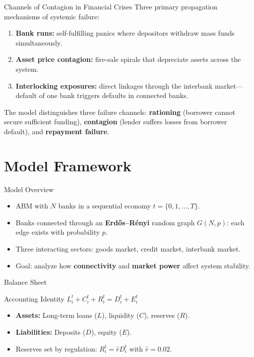 \begin{frame}{Channels of Contagion in Financial Crises}
  Three primary propagation mechanisms of systemic failure:
  \begin{enumerate}
    \item \textbf{Bank runs:} self-fulfilling panics where depositors withdraw mass funds simultaneously.
    \item \textbf{Asset price contagion:} fire-sale spirals that depreciate assets across the system.
    \item \textbf{Interlocking exposures:} direct linkages through the interbank market---default of one bank triggers defaults in connected banks.
  \end{enumerate}
  \vspace{0.3cm}
  The model distinguishes three failure channels: \textbf{rationing} (borrower cannot secure sufficient funding), \textbf{contagion} (lender suffers losses from borrower default), and \textbf{repayment failure}.
\end{frame}



\section{Model Framework}\label{sec:3}

\begin{frame}{Model Overview}
  \begin{itemize}
    \item ABM with $N$ banks in a sequential economy $t = \{0, 1, \dots, T\}$.
    \item Banks connected through an \textbf{Erd\H{o}s--R\'enyi} random graph $G(N, p)$: each edge exists with probability $p$.
    \item Three interacting sectors: goods market, credit market, interbank market.
    \item Goal: analyze how \textbf{connectivity} and \textbf{market power} affect system stability.
  \end{itemize}
\end{frame}

\begin{frame}{Balance Sheet}
  \begin{block}{Accounting Identity}
    $L^t_i + C^t_i + R^t_i = D^t_i + E^t_i$
  \end{block}
  \begin{itemize}
    \item \textbf{Assets:} Long-term loans ($L$), liquidity ($C$), reserves ($R$).
    \item \textbf{Liabilities:} Deposits ($D$), equity ($E$).
    \item Reserves set by regulation: $R_i^t = \hat{r} D_i^t$ with $\hat{r} = 0.02$.
  \end{itemize}
\end{frame}

